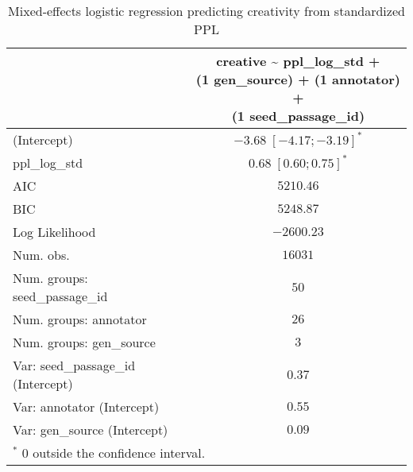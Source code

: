
\usepackage{booktabs}

\begin{table}[htbp]
\begin{center}
\begin{tabular}{l c}
\toprule
 & \shortstack[l]{creative \textasciitilde{} ppl\_log\_std + \\ 
(1 \textbar{} gen\_source) + (1 \textbar{} annotator) + \\ 
(1 \textbar{} seed\_passage\_id)} \\
\midrule
(Intercept)                        & $-3.68 \; [-4.17; -3.19]^{*}$ \\
ppl\_log\_std                      & $0.68 \; [ 0.60;  0.75]^{*}$  \\
\midrule
AIC                                & $5210.46$                     \\
BIC                                & $5248.87$                     \\
Log Likelihood                     & $-2600.23$                    \\
Num. obs.                          & $16031$                       \\
Num. groups: seed\_passage\_id     & $50$                          \\
Num. groups: annotator             & $26$                          \\
Num. groups: gen\_source           & $3$                           \\
Var: seed\_passage\_id (Intercept) & $0.37$                        \\
Var: annotator (Intercept)         & $0.55$                        \\
Var: gen\_source (Intercept)       & $0.09$                        \\
\bottomrule
\multicolumn{2}{l}{\scriptsize{$^*$ 0 outside the confidence interval.}}
\end{tabular}
\caption{Mixed-effects logistic regression predicting creativity from standardized PPL}
\label{tab:glmer_ppl}
\end{center}
\end{table}

